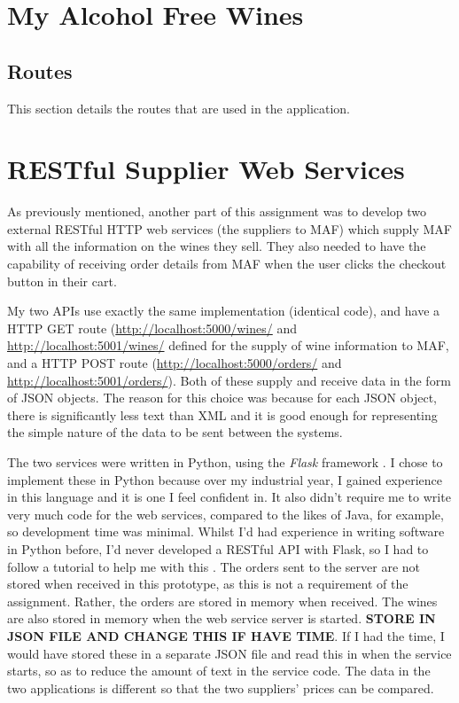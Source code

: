 \documentclass[a4paper,12pt,hidelinks]{report}
\begin{document}
    \section{My Alcohol Free Wines}
    \subsection{Routes}
    This section details the routes that are used in the application.


    \section{RESTful Supplier Web Services}
    As previously mentioned, another part of this assignment was to develop two external RESTful HTTP web services (the suppliers to MAF) which
    supply MAF with all the information on the wines they sell. They also needed to have the capability of receiving order details from MAF when the
    user clicks the checkout button in their cart.

    My two APIs use exactly the same implementation (identical code), and have a HTTP GET route (\url{http://localhost:5000/wines/} and \url{http://localhost:5001/wines/} 
    defined for the supply of wine information to MAF, and a HTTP POST route (\url{http://localhost:5000/orders/} and \url{http://localhost:5001/orders/}).
    Both of these supply and receive data in the form of JSON objects. The reason for this choice was because for each JSON object, there is significantly less
    text than XML and it is good enough for representing the simple nature of the data to be sent between the systems.

    The two services were written in Python, using the \textit{Flask} framework \cite{flask-framework}. I chose to implement these in Python because over my industrial 
    year, I gained experience in this language and it is one I feel confident in. It also didn't require me to write very much code for the web services, compared to the likes of
    Java, for example, so development time was minimal. Whilst I'd had experience in writing software in Python before, I'd never developed a RESTful API with Flask,
    so I had to follow a tutorial to help me with this \cite{flask-tutorial}. The orders sent to the server are not stored when received in this prototype, as this
    is not a requirement of the assignment. Rather, the orders are stored in memory when received. The wines are also stored in memory when the web service server is
    started. \textbf{STORE IN JSON FILE AND CHANGE THIS IF HAVE TIME}. If I had the time, I would have stored these in a separate JSON file and read this in when the service
    starts, so as to reduce the amount of text in the service code. The data in the two applications is different so that the two suppliers' prices can be compared.
\end{document}
